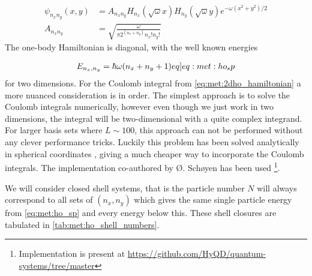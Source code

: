 \begin{align*}
    \psi_{n_x n_y} (x,y) &= A_{n_x n_y} H_{n_{x}} (\sqrt{\omega}x) H_{n_{y}} (\sqrt{\omega}y) e^{-\omega (x^2 + y^2)/2} \\
    A_{n_x n_y} &= \sqrt{\frac{\omega}{\pi 2^{(n_x+n_y)}n_x ! n_y !}}
\end{align*}
The one-body Hamiltonian is diagonal, with the well known energies

\begin{align}
    E_{n_x,n_y} = \hbar \omega (n_x + n_y + 1) \label[eq]{eq:met:ho_sp}
\end{align}
for two dimensions. For the Coulomb integral from \cref{eq:met:2dho_hamiltonian} a more nuanced consideration is in order. The simplest approach is to solve the Coulomb integrals numerically, however even though we just work in two dimensions, the integral will be two-dimensional with a quite complex integrand. For larger basis sets where $L \sim 100$, this approach can not be performed without any clever performance tricks. Luckily this problem has been solved analytically in spherical coordinates \citep{anisimovasEnergySpectraFewelectron1998}, giving a much cheaper way to incorporate the Coulomb integrals. The implementation co-authored by Ø. Schøyen has been used \footnote{Implementation is present at \url{https://github.com/HyQD/quantum-systems/tree/master}}.

We will consider closed shell systems, that is the particle number $N$ will always correspond to all sets of $(n_x, n_y)$ which gives the same single particle energy from \cref{eq:met:ho_sp} and every energy below this. These shell closures are tabulated in \cref{tab:met:ho_shell_numbers}.

